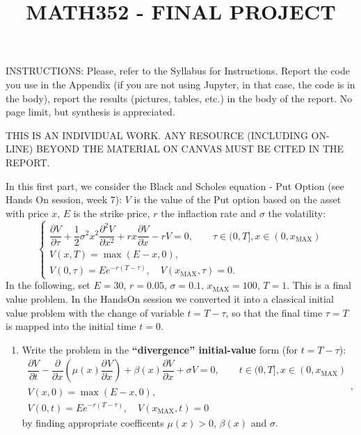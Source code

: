 \documentclass{article}
\newcommand{\tmname}[1]{\textsc{#1}}
\newcommand{\tmop}[1]{\ensuremath{\operatorname{#1}}}
\newcommand{\tmsamp}[1]{\textsf{#1}}
\newcommand{\tmstrong}[1]{\textbf{#1}}
\newenvironment{enumeratenumeric}{\begin{enumerate}[1.] }{\end{enumerate}}
{\theorembodyfont{\rmfamily\small}\newtheorem{problem}{Problem}}
\begin{document}
\title{MATH352 - FINAL PROJECT}

\maketitle

{\tmsamp{INSTRUCTIONS:
Please, refer to the Syllabus for Instructions.
Report the code you use in the Appendix (if you are not using Jupyter, in that
case, the code is in the body), report the results (pictures, tables, etc.) in
the body of the report.
No page limit, but synthesis is appreciated.}}

{\tmsamp{THIS IS AN INDIVIDUAL WORK}}. {\tmsamp{ANY RESOURCE (INCLUDING
ON-LINE) BEYOND THE MATERIAL ON CANVAS MUST BE CITED IN THE REPORT.}}

\begin{problem}
  In this first part, we consider the Black and Scholes equation - Put Option
  (see Hands On session, week 7): $V$ is the value of the Put option based on
  the asset with price {\tmname{$x$}}, $E$ is the strike price, $r$ the
  inflaction rate and $\sigma$ the volatility: \
  \[ \left\{\begin{array}{l}
       \dfrac{\partial V}{\partial \tau} + \dfrac{1}{2} \sigma^2 x^2
       \dfrac{\partial^2 V}{\partial x^2} + r x \dfrac{\partial V}{\partial x}
       - r V = 0, \qquad \tau \in (0, T], x \in (0, x_{\tmop{MAX}})\\
       V (x, T) = \max (E - x, 0),\\
       V (0, \tau) = E e^{- r (T - \tau)}, \quad V (x_{\tmop{MAX}}, \tau) = 0.
     \end{array}\right. \]
  In the following, set $E = 30$, $r = 0.05$, $\sigma = 0.1$, $x_{\tmop{MAX}}
  = 100$, $T = 1.$ This is a final value problem. In the HandsOn session we
  converted it into a classical initial value problem with the change of
  variable $t = T - \tau$, so that the final time $\tau = T$ is mapped into
  the initial time $t = 0$.
  \begin{enumeratenumeric}
    \item Write the problem in the {\tmstrong{``divergence'' initial-value}}
    form (for $t = T - \tau$):
    \[ \begin{array}{l}
         \dfrac{\partial V}{\partial t} - \dfrac{\partial}{\partial x} \left(
         \mu (x) \dfrac{\partial^{} V}{\partial x^{}} \right) + \beta (x)
         \dfrac{\partial V}{\partial x} + \sigma V = 0, \qquad t \in (0, T], x
         \in (0, x_{\tmop{MAX}})\\
         V (x, 0) = \max (E - x, 0),\\
         V (0, t) = E e^{- r (T - \tau)}, \quad V (x_{\tmop{MAX}}, t) = 0
       \end{array}, \]
    by finding appropriate coefficents $\mu (x) > 0$, $\beta (x)$ and $\sigma
    .$
    

\end{enumeratenumeric}
\end{problem}
\end{document}
